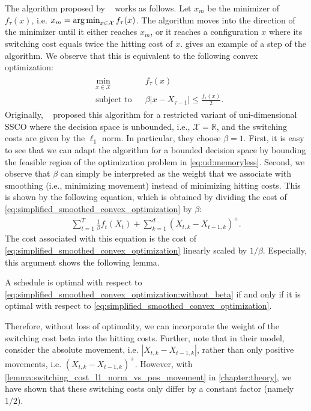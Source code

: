 The algorithm proposed by \citeauthor*{Bansal2015}~\cite{Bansal2015} works as follows. Let $x_m$ be the minimizer of $f_{\tau}(x)$, i.e. $x_m = \operatorname*{arg\,min}_{x \in \mathcal{X}} f_{\tau}(x)$. The algorithm moves into the direction of the minimizer until it either reaches $x_m$, or it reaches a configuration $x$ where its switching cost equals twice the hitting cost of $x$.  gives an example of a step of the algorithm. We observe that this is equivalent to the following convex optimization: \begin{align}\label{eq:ud:memoryless}\begin{aligned}
    &\min_{x \in \mathcal{X}} &&f_{\tau}(x) \\
    &\text{subject to}        &&\beta |x - X_{\tau-1}| \leq \frac{f_{\tau}(x)}{2}.
\end{aligned}\end{align} Originally, \citeauthor*{Bansal2015}~\cite{Bansal2015} proposed this algorithm for a restricted variant of uni-dimensional SSCO where the decision space is unbounded, i.e., $\mathcal{X} = \mathbb{R}$, and the switching costs are given by the $\ell_1$ norm. In particular, they choose $\beta = 1$. First, it is easy to see that we can adapt the algorithm for a bounded decision space by bounding the feasible region of the optimization problem in \cref{eq:ud:memoryless}. Second, we observe that $\beta$ can simply be interpreted as the weight that we associate with smoothing (i.e., minimizing movement) instead of minimizing hitting costs. This is shown by the following equation, which is obtained by dividing the cost of \cref{eq:simplified_smoothed_convex_optimization} by $\beta$: \begin{align}\label{eq:simplified_smoothed_convex_optimization:without_beta}
    \sum_{t=1}^T \frac{1}{\beta} f_t(X_t) + \sum_{k=1}^d (X_{t,k} - X_{t-1,k})^+.
\end{align} The cost associated with this equation is the cost of \cref{eq:simplified_smoothed_convex_optimization} linearly scaled by $1 / \beta$. Especially, this argument shows the following lemma.

\begin{lemma}\label{lemma:switching_cost_absolute_vs_positive_movement}
A schedule is optimal with respect to \cref{eq:simplified_smoothed_convex_optimization:without_beta} if and only if it is optimal with respect to \cref{eq:simplified_smoothed_convex_optimization}.
\end{lemma}

Therefore, without loss of optimality, we can incorporate the weight of the switching cost beta into the hitting costs. Further, note that in their model, \citeauthor*{Bansal2015}~\cite{Bansal2015} consider the absolute movement, i.e. $|X_{t,k} - X_{t-1,k}|$, rather than only positive movements, i.e. $(X_{t,k} - X_{t-1,k})^+$. However, with \cref{lemma:switching_cost_l1_norm_vs_pos_movement} in \cref{chapter:theory}, we have shown that these switching costs only differ by a constant factor (namely $1/2$).

